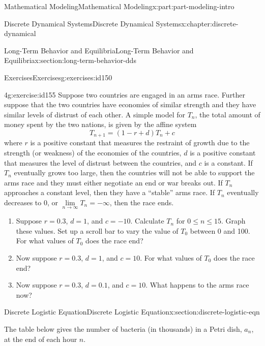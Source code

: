 \documentclass[oneside,10pt,]{book}
\numberwithin{equation}{section}
\begin{document}
\begin{partptx}{Mathematical Modeling}{}{Mathematical Modeling}{}{}{x:part:part-modeling-intro}
\begin{chapterptx}{Discrete Dynamical Systems}{}{Discrete Dynamical Systems}{}{}{x:chapter:discrete-dynamical}
\begin{sectionptx}{Long-Term Behavior and Equilibria}{}{Long-Term Behavior and Equilibria}{}{}{x:section:long-term-behavior-dds}
\begin{exercises-subsection-numberless}{Exercises}{}{Exercises}{}{}{g:exercises:id150}
\begin{divisionexercise}{4}{}{}{g:exercise:id155}%
Suppose two countries are engaged in an arms race. Further suppose that the two countries have economies of similar strength and they have similar levels of distrust of each other. A simple model for \(T_n\), the total amount of money spent by the two nations, is given by the affine system%
%
\begin{equation*}
T_{n+1} = (1-r+d)T_n + c
\end{equation*}
where \(r\) is a positive constant that measures the restraint of growth due to the strength (or weakness) of the economies of the countries, \(d\) is a positive constant that measures the level of distrust between the countries, and \(c\) is a constant. If \(T_n\) eventually grows too large, then the countries will not be able to support the arms race and they must either negotiate an end or war breaks out. If \(T_n\) approaches a constant level, then they have a ``stable'' arms race. If \(T_n\) eventually decreases to 0, or \(\lim\limits_{n\to\infty} T_n = -\infty\), then the race ends.%
\begin{enumerate}[font=\bfseries,label=(\alph*),ref=\alph*]
\item{}Suppose \(r = 0.3\), \(d = 1\), and \(c = -10\). Calculate \(T_n\) for \(0 \le n \le 15\). Graph these values. Set up a scroll bar to vary the value of \(T_0\) between 0 and 100. For what values of \(T_0\) does the race end?%
\item{}Now suppose \(r = 0.3\), \(d = 1\), and \(c = 10\). For what values of \(T_0\) does the race end?%
\item{}Now suppose \(r = 0.3\), \(d = 0.1\), and \(c = 10\). What happens to the arms race now?%
\end{enumerate}
\end{divisionexercise}%
\end{exercises-subsection-numberless}
\end{sectionptx}
%
%
\typeout{************************************************}
\typeout{************************************************}
%
\begin{sectionptx}{Discrete Logistic Equation}{}{Discrete Logistic Equation}{}{}{x:section:discrete-logistic-eqn}
\begin{introduction}{}%
The table below gives the number of bacteria (in thousands) in a Petri dish, \(a_n\), at the end of each hour \(n\).%
%
\begin{equation*}

\end{equation*}
\end{introduction}
\end{sectionptx}
\end{chapterptx}
\end{partptx}
\end{document}
